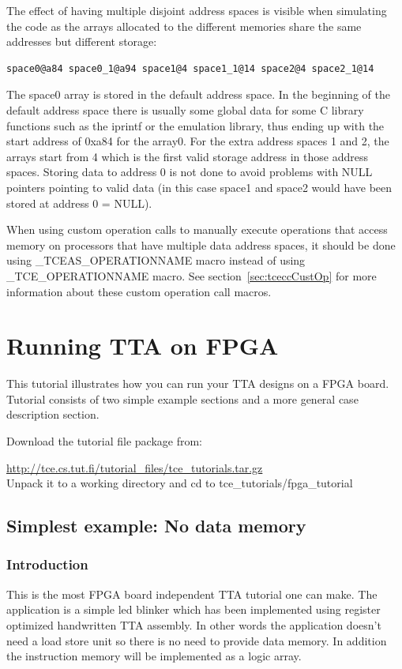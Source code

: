 \documentclass[twoside]{tceusermanual}
\begin{document}
The effect of having multiple disjoint address spaces is visible when 
simulating the code as the arrays allocated to the different memories share 
the same addresses but different storage:

\begin{verbatim}
space0@a84 space0_1@a94 space1@4 space1_1@14 space2@4 space2_1@14
\end{verbatim}

The space0 array is stored in the default address space. In the beginning
of the default address space there is usually some global data for 
some C library functions
such as the iprintf or the emulation library, thus ending up with the
start address of 0xa84 for the array0. For the extra address spaces
1 and 2, the arrays start from 4 which is the first valid storage address in
those address spaces. Storing data to address 0 is not done to avoid 
problems with NULL pointers pointing to valid data (in this case space1 and
space2 would have been stored at address 0 = NULL).

When using custom operation calls to manually execute operations that access
memory on processors that have multiple data address spaces,
it should be done using \_TCEAS\_OPERATIONNAME macro instead of using
\_TCE\_OPERATIONNAME macro. See section~\ref{sec:tceccCustOp}
 for more information about these custom operation call macros.

\section{Running TTA on FPGA}
\label{sec:fpgatutorial}

This tutorial illustrates how you can run your TTA designs on a FPGA board.
Tutorial consists of two simple example sections and a more general case
description section.

Download the tutorial file package from:

\url{http://tce.cs.tut.fi/tutorial_files/tce_tutorials.tar.gz}\\

Unpack it to a working directory and cd to tce\_tutorials/fpga\_tutorial

\subsection{Simplest example: No data memory}
\subsubsection{Introduction}
This is the most FPGA board independent TTA tutorial one can make. The
application is a simple led blinker which has been implemented using register
optimized handwritten TTA assembly. In other words the application
doesn't need a load store unit so there is no need to provide data memory. In
addition the instruction memory will be implemented as a logic array.
\end{document}
